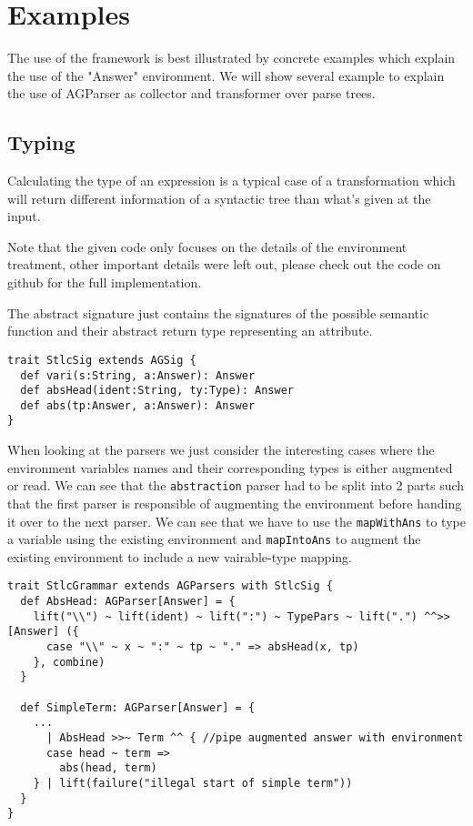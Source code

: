 \section{Examples}
The use of the framework is best illustrated by concrete examples which explain the use of the "Answer" environment. We will show several example to explain the use of AGParser as collector and transformer over parse trees.

\subsection{Typing}
Calculating the type of an expression is a typical case of a transformation which will return different information of a syntactic tree than what's given at the input.

Note that the given code only focuses on the details of the environment treatment, other important details were left out, please check out the code on github for the full implementation.

The abstract signature just contains the signatures of the possible semantic function and their abstract return type representing an attribute.
\begin{lstlisting}
trait StlcSig extends AGSig {
  def vari(s:String, a:Answer): Answer
  def absHead(ident:String, ty:Type): Answer
  def abs(tp:Answer, a:Answer): Answer
}
\end{lstlisting}

When looking at the parsers we just consider the interesting cases where the environment variables names and their corresponding types is either augmented or read. We can see that the \verb/abstraction/ parser had to be split into 2 parts such that the first parser is responsible of augmenting the environment before handing it over to the next parser.
We can see that we have to use the \verb/mapWithAns/ to type a variable using the existing environment and \verb/mapIntoAns/ to augment the existing environment to include a new vairable-type mapping.
\begin{lstlisting}
trait StlcGrammar extends AGParsers with StlcSig {
  def AbsHead: AGParser[Answer] = {
    lift("\\") ~ lift(ident) ~ lift(":") ~ TypePars ~ lift(".") ^^>>[Answer] ({
      case "\\" ~ x ~ ":" ~ tp ~ "." => absHead(x, tp)
    }, combine)
  }

  def SimpleTerm: AGParser[Answer] = {
    ...
      | AbsHead >>~ Term ^^ { //pipe augmented answer with environment
      case head ~ term =>
        abs(head, term)
    } | lift(failure("illegal start of simple term"))
  }
}
\end{lstlisting}

